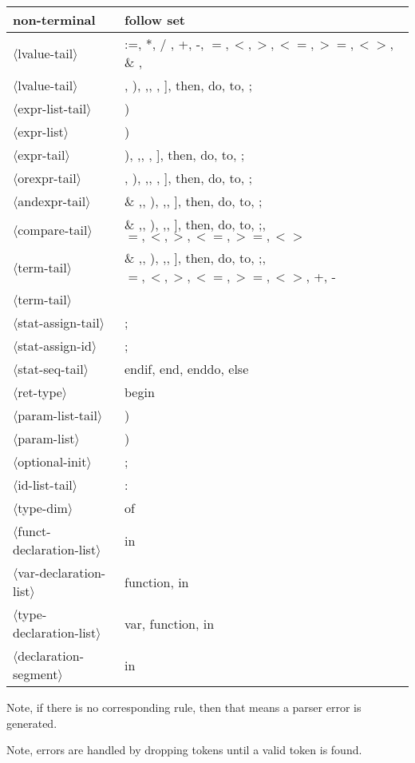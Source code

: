 \documentclass[11pt, fleqn]{article}
\newcommand{\atag}[1]{$\langle$#1$\rangle$}
\begin{document}
\begin{longtable}{l|l}
non-terminal						&	follow set												\\
\hline
\atag{lvalue-tail}				&	:=, *, /	, +, -, $=, <, >, <=, >=, <>$, \& , \\
\atag{lvalue-tail}				&	\textbar , ), ,, , ], then, do, to, ; 	\\
\atag{expr-list-tail}			&	)												\\
\atag{expr-list}					&	)								\\
\atag{expr-tail}					&	), ,, , ], then, do, to, ;	\\
\atag{orexpr-tail}				&	\textbar , ), ,, , ], then, do, to, ;	\\
\atag{andexpr-tail}				&	\& ,\textbar , ), ,, ], then, do, to, ; 	\\
\atag{compare-tail}				&	\& ,\textbar , ), ,, ], then, do, to, ;, $=, <, >, <=, >=, <>$	\\
\atag{term-tail}					&	\& ,\textbar , ), ,, ], then, do, to, ;, $=, <, >, <=, >=, <>$, +, -	\\
\atag{term-tail}					&	\\
\atag{stat-assign-tail}			&	;	\\
\atag{stat-assign-id}			&	;	\\
\atag{stat-seq-tail}				&	endif, end, enddo, else		\\
\atag{ret-type}					&	begin		\\
\atag{param-list-tail}			&	)	\\
\atag{param-list}				&	)		\\
\atag{optional-init}				&	;		\\
\atag{id-list-tail}				&	:		\\
\atag{type-dim}					&	of	\\
\atag{funct-declaration-list}	&	in	\\
\atag{var-declaration-list}		&	function, in	\\
\atag{type-declaration-list}		&	var, function, in		\\
\atag{declaration-segment}		&	in	\\
\end{longtable}


Note, if there is no corresponding rule, then that means a parser error is generated.

Note, errors are handled by dropping tokens until a valid token is found.
\end{document}
